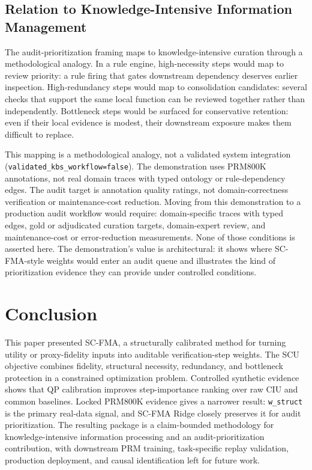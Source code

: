 \documentclass[a4paper,fleqn]{cas-sc}
\begin{document}
\subsection{Relation to Knowledge-Intensive Information Management}
\label{sec:audit-kbs-analogy}

The audit-prioritization framing maps to knowledge-intensive curation through a methodological analogy. In a rule engine, high-necessity steps would map to review priority: a rule firing that gates downstream dependency deserves earlier inspection. High-redundancy steps would map to consolidation candidates: several checks that support the same local function can be reviewed together rather than independently. Bottleneck steps would be surfaced for conservative retention: even if their local evidence is modest, their downstream exposure makes them difficult to replace.

This mapping is a methodological analogy, not a validated system integration (\texttt{validated\_kbs\_workflow=false}). The demonstration uses PRM800K annotations, not real domain traces with typed ontology or rule-dependency edges. The audit target is annotation quality ratings, not domain-correctness verification or maintenance-cost reduction. Moving from this demonstration to a production audit workflow would require: domain-specific traces with typed edges, gold or adjudicated curation targets, domain-expert review, and maintenance-cost or error-reduction measurements. None of those conditions is asserted here. The demonstration's value is architectural: it shows where SC-FMA-style weights would enter an audit queue and illustrates the kind of prioritization evidence they can provide under controlled conditions.

\section{Conclusion}

This paper presented SC-FMA, a structurally calibrated method for turning utility or proxy-fidelity inputs into auditable verification-step weights. The SCU objective combines fidelity, structural necessity, redundancy, and bottleneck protection in a constrained optimization problem. Controlled synthetic evidence shows that QP calibration improves step-importance ranking over raw CIU and common baselines. Locked PRM800K evidence gives a narrower result: \texttt{w\_struct} is the primary real-data signal, and SC-FMA Ridge closely preserves it for audit prioritization. The resulting package is a claim-bounded methodology for knowledge-intensive information processing and an audit-prioritization contribution, with downstream PRM training, task-specific replay validation, production deployment, and causal identification left for future work.
\end{document}
